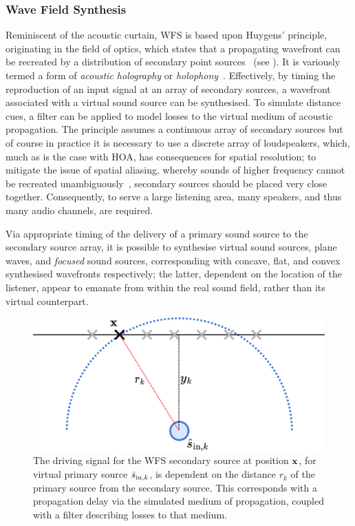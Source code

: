 \subsubsection{Wave Field Synthesis}

Reminiscent of the acoustic curtain, WFS is based upon Huygens' principle,
originating in the field of optics, which states that a propagating
wavefront can be recreated by a distribution of secondary point
sources~\citep{mueller_acoustic_1971,berkhout_acoustic_1993,
    belloch_performance_2021} (see ).
It is variously termed a form of \textit{acoustic holography} or
\textit{holophony}~\citep{berkhout_holographic_1988,ahrens_analytic_2012}.
Effectively, by timing the reproduction of an input signal at an array of
secondary sources, a wavefront associated with a virtual sound source can be
synthesised.
To simulate distance cues, a filter can be applied to model losses to the
virtual medium of acoustic propagation.
The principle assumes a continuous array of secondary sources but of course in
practice it is necessary to use a discrete array of loudspeakers, which,
much as is the case with HOA, has consequences for spatial resolution;
to mitigate the issue of spatial aliasing, whereby sounds of higher frequency
cannot be recreated unambiguously~\citep{winter_geometric_2018},
secondary sources should be placed very close together.
Consequently, to serve a large listening area, many speakers, and thus many
audio channels, are required.

Via appropriate timing of the delivery of a primary sound source to the
secondary source array, it is possible to synthesise virtual sound sources,
plane waves, and \textit{focused} sound sources, corresponding with concave,
flat, and convex synthesised wavefronts respectively; the latter, dependent
on the location of the listener, appear to emanate from within the real
sound field, rather than its virtual counterpart.

\begin{figure}[ht]
    \centering
    \includegraphics[width=.75\textwidth]{figures/wfs_2}
    \caption{
        The driving signal for the WFS secondary source at position $\mathbf{x}$,
        for virtual primary source $\hat{s}_{\text{in},k}$, is dependent on the distance
        $r_k$ of the primary source from the secondary source.
        This corresponds with a propagation delay via the simulated medium of
        propagation, coupled with a filter describing losses to that medium.
    }
    \label{fig:wfs_2}
\end{figure}

